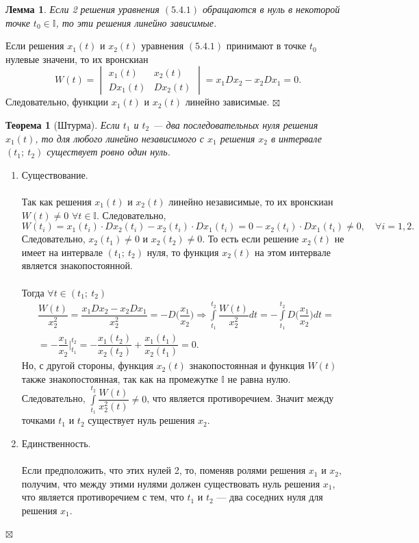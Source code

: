 \documentclass[a4paper, 12pt]{report}
\newenvironment{Proof} %
{\par\noindent{$\blacklozenge$}} %
{\hfill$\scriptstyle\boxtimes$}
\newcommand{\I}{\mathbb{I}}
\newtheorem*{theorem}{Теорема}
\newtheorem*{lem}{Лемма}
\begin{document}
\begin{lem}
	Если 2 решения уравнения $(5.4.1)$ обращаются в нуль в некоторой точке $t_0 \in \I$, то эти решения линейно зависимые.
\end{lem}\begin{Proof}
Если решения $x_1(t)$ и $x_2(t)$ уравнения $(5.4.1)$ принимают в точке $t_0$ нулевые значени, то их вронскиан $$W(t) = \begin{vmatrix}
	x_1(t) & x_2(t)\\
	Dx_1(t) & Dx_2(t)
\end{vmatrix} = x_1Dx_2 - x_2Dx_1 = 0.$$
Следовательно, функции $x_1(t)$ и $x_2(t)$ линейно зависимые.
\end{Proof}
\begin{theorem}
	[Штурма]
	Если $t_1$ и $t_2$ --- два последовательных нуля решения $x_1(t)$, то для любого линейно независимого с $x_1$ решения $x_2$ в интервале $(t_1;\ t_2)$ существует ровно один нуль.
\end{theorem}\begin{Proof}
\begin{enumerate}
	\item Существование.\\\\
	Так как решения $x_1(t)$ и $x_2(t)$ линейно независимые, то их вронскиан $W(t) \ne 0$ $\forall t \in \I$. Следовательно, $$W(t_i) = x_1(t_i)\cdot Dx_2(t_i) - x_2(t_i)\cdot Dx_1(t_i) = 0 - x_2(t_i)\cdot Dx_1(t_i) \ne 0,\quad \forall i = 1,2.$$
	Следовательно, $x_2(t_1) \ne 0$ и $x_2(t_2) \ne 0$. То есть если решение $x_2(t)$ не имеет на интервале  $(t_1;\ t_2)$ нуля, то функция $x_2(t)$ на этом интервале является знакопостоянной.\\\\
	Тогда $\forall t \in (t_1;\ t_2)$
	\begin{multline*}
		\dfrac{W(t)}{x_2^2} = \dfrac{x_1Dx_2 - x_2Dx_1}{x_2^2} = -D\Big(\dfrac{x_1}{x_2}\Big) \Rightarrow \int\limits_{t_1}^{t_2} \dfrac{W(t)}{x_2^2} dt = - \int\limits_{t_1}^{t_2} D\Big(\dfrac{x_1}{x_2}\Big)dt =\\= -\dfrac{x_1}{x_2}\Big|_{t_1}^{t_2} = -\dfrac{x_1(t_2)}{x_2(t_2)} + \dfrac{x_1(t_1)}{x_2(t_1)} = 0.
	\end{multline*}
Но, с другой стороны, функция $x_2(t)$ знакопостоянная и функция $W(t)$ также знакопостоянная, так как на промежутке $\I$ не равна нулю. Следовательно, $\int\limits_{t_1}^{t_2}\dfrac{W(t)}{x_2^2(t)} \ne 0$, что является противоречием. Значит между точками $t_1$ и $t_2$ существует нуль решения $x_2$.
\item Единственность.\\\\
Если предположить, что этих нулей 2, то, поменяв ролями решения $x_1$ и $x_2$, получим, что между этими нулями должен существовать нуль решения $x_1$, что является противоречием с тем, что $t_1$ и $t_2$ --- два соседних нуля для решения $x_1$.
\end{enumerate}
\end{Proof}
\end{document}
